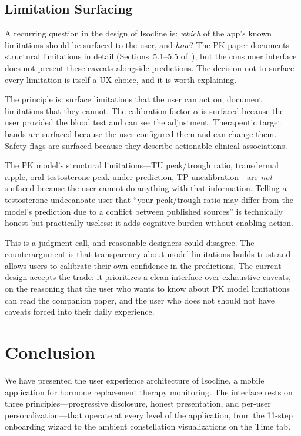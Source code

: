 \documentclass[11pt,a4paper]{article}
\begin{document}
\subsection{Limitation Surfacing}
\label{sec:limitation_surfacing}

A recurring question in the design of Isocline is: \emph{which} of the app's
known limitations should be surfaced to the user, and \emph{how}? The PK
paper documents structural limitations in detail (Sections~5.1--5.5
of~\cite{xtpk}), but the consumer interface does not present these
caveats alongside predictions. The decision not to surface every
limitation is itself a UX choice, and it is worth explaining.

The principle is: surface limitations that the user can act on; document
limitations that they cannot. The calibration factor $\alpha$ is surfaced
because the user provided the blood test and can see the adjustment.
Therapeutic target bands are surfaced because the user configured them and
can change them. Safety flags are surfaced because they describe
actionable clinical associations.

The PK model's structural limitations---TU peak/trough ratio,
transdermal ripple, oral testosterone peak under-prediction, TP
uncalibration---are \emph{not} surfaced because the user cannot do
anything with that information. Telling a testosterone undecanoate user
that ``your peak/trough ratio may differ from the model's prediction due
to a conflict between published sources'' is technically honest but
practically useless: it adds cognitive burden without enabling action.

This is a judgment call, and reasonable designers could disagree. The
counterargument is that transparency about model limitations builds trust
and allows users to calibrate their own confidence in the predictions.
The current design accepts the trade: it prioritizes a clean interface
over exhaustive caveats, on the reasoning that the user who wants to know
about PK model limitations can read the companion paper, and the user who
does not should not have caveats forced into their daily experience.

\section{Conclusion}
\label{sec:conclusion}

We have presented the user experience architecture of Isocline, a mobile
application for hormone replacement therapy monitoring. The interface
rests on three principles---progressive disclosure, honest presentation,
and per-user personalization---that operate at every level of the
application, from the 11-step onboarding wizard to the ambient
constellation visualizations on the Time tab.
\end{document}
